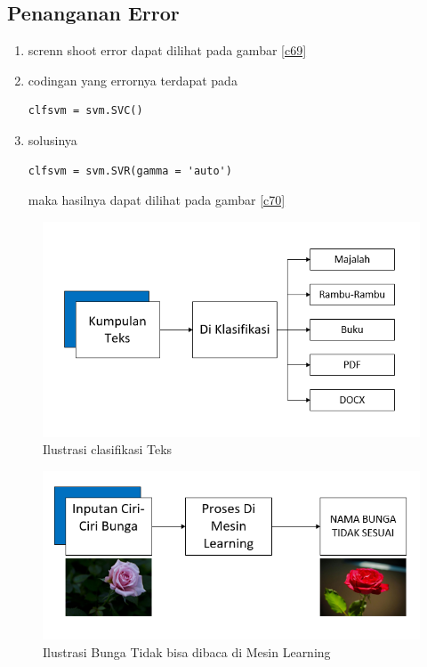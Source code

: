 \subsection{Penanganan Error}
\begin{enumerate}
\item screnn shoot error dapat dilihat pada gambar \ref{c69}
\item codingan yang errornya terdapat pada 
\begin{verbatim}
clfsvm = svm.SVC()
\end{verbatim}
\item solusinya
\begin{verbatim}
clfsvm = svm.SVR(gamma = 'auto')
\end{verbatim}
maka hasilnya dapat dilihat pada gambar \ref{c70}
\end{enumerate}

\begin{figure}
      \centerline{\includegraphics[width=1\textwidth]
      {figures/cokro/c55}}
      \caption{Ilustrasi clasifikasi Teks}
      \label{c55}
      \end{figure}

\begin{figure}
      \centerline{\includegraphics[width=1\textwidth]
      {figures/cokro/c56}}
      \caption{Ilustrasi Bunga Tidak bisa dibaca di Mesin Learning}
      \label{c56}
      \end{figure}


